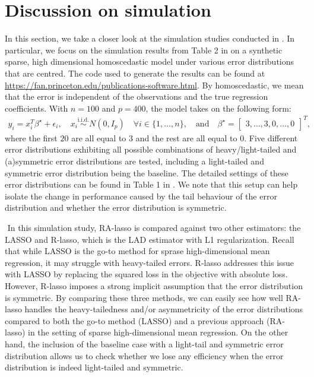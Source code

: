 

\section{Discussion on simulation}\label{sec:simulation}
In this section, we take a closer look at the simulation studies conducted in \citet{fan2017estimation}. In particular, we focus on the simulation results from Table 2 in \citet{fan2017estimation} on a synthetic sparse, high dimensional homoscedastic model under various error distributions that are centred. The code used to generate the results can be found at \url{https://fan.princeton.edu/publications-software.html}. By homoscedastic, we mean that the error is independent of the observations and the true regression coefficients. With $n=100$ and $p=400$, the model takes on the following form:
\begin{align*}
y_i = x_i^T \beta^\star + \epsilon_i, \quad x_i \overset{\text{i.i.d.}}{\sim} N(0, I_p) \quad \forall i \in \{1,\dots,n\}, \quad \text{and} \quad \beta^\star = \begin{bmatrix} 3, \dots, 3, 0, \dots, 0 \end{bmatrix}^T,
\end{align*}
where the first $20$ are all equal to $3$ and the rest are all equal to $0$. Five different error distributions exhibiting all possible combinations of heavy/light-tailed and (a)symmetric error distributions are tested, including a light-tailed and symmetric error distribution being the baseline. The detailed settings of these error distributions can be found in Table 1 in \citet{fan2017estimation}. We note that this setup can help isolate the change in performance caused by the tail behaviour of the error distribution and whether the error distribution is symmetric.

$ $\newline
In this simulation study, RA-lasso is compared against two other estimators: the LASSO and R-lasso, which is the LAD estimator with L1 regularization. Recall that while LASSO is the go-to method for sprase high-dimensional mean regression, it may struggle with heavy-tailed errors. R-lasso addresses this issue with LASSO by replacing the squared loss in the objective with absolute loss. However, R-lasso imposes a strong implicit assumption that the error distribution is symmetric. By comparing these three methods, we can easily see how well RA-lasso handles the heavy-tailedness and/or asymmetricity of the error distributions compared to both the go-to method (LASSO) and a previous approach (RA-lasso) in the setting of sparse high-dimensional mean regression. On the other hand, the inclusion of the baseline case with a light-tail and symmetric error distribution allows us to check whether we lose any efficiency when the error distribution is indeed light-tailed and symmetric.

